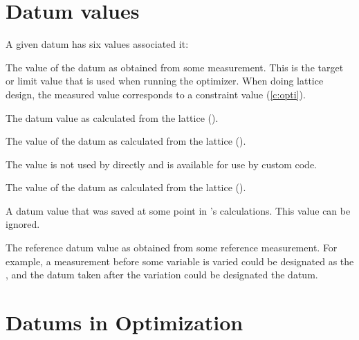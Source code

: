 \section{Datum values}
\label{s:datum.values}

A given datum has six values associated it:
\vspace{-2ex}
\begin{description}
  \vspace{-1ex}
  \item[meas] \Newline 
The value of the datum as obtained from some measurement. This is the
target or limit value that is used when running the optimizer. When
doing lattice design, the measured value corresponds to a constraint
value (\ref{c:opti}).
  \vspace{-1ex}
  \item[base] \Newline
The datum value as calculated from the  lattice ().
  \vspace{-0.5ex}
  \item[design] \Newline
The value of the datum as calculated from the  lattice ().
  \vspace{-0.5ex}
  \item[fit] \Newline
The  value is not used by \tao directly and is available for use by custom code.
  \vspace{-0.5ex}
  \item[model] \Newline
The value of the datum as calculated from the  lattice ().
  \vspace{-0.5ex}
  \item[old] \Newline
A datum value that was saved at some point in \tao's calculations. This value
can be ignored.
  \vspace{-0.5ex}
  \item[ref] \Newline
The reference datum value as obtained from some reference measurement. For example,
a measurement before some variable is varied could be designated as
the , and the datum taken after the variation could be 
designated the  datum.
\end{description}

\section{Datums in Optimization}
\label{s:datum.opt}

